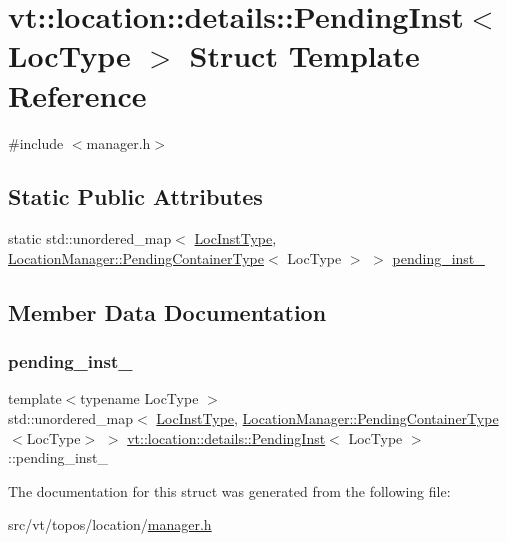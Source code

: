 \hypertarget{structvt_1_1location_1_1details_1_1_pending_inst}{}\section{vt\+:\+:location\+:\+:details\+:\+:Pending\+Inst$<$ Loc\+Type $>$ Struct Template Reference}
\label{structvt_1_1location_1_1details_1_1_pending_inst}


{\ttfamily \#include $<$manager.\+h$>$}

\subsection*{Static Public Attributes}
\begin{DoxyCompactItemize}
\item 
static std\+::unordered\+\_\+map$<$ \hyperlink{namespacevt_1_1location_a4db6456e8024af2d23fc5ae560fef866}{Loc\+Inst\+Type}, \hyperlink{structvt_1_1location_1_1_location_manager_aad005a828c535232cd6b63859b25b171}{Location\+Manager\+::\+Pending\+Container\+Type}$<$ Loc\+Type $>$ $>$ \hyperlink{structvt_1_1location_1_1details_1_1_pending_inst_ada747cad12a1705e6a7759d0e2b08476}{pending\+\_\+inst\+\_\+}
\end{DoxyCompactItemize}


\subsection{Member Data Documentation}
\mbox{\label{structvt_1_1location_1_1details_1_1_pending_inst_ada747cad12a1705e6a7759d0e2b08476}} 
\subsubsection{\texorpdfstring{pending\+\_\+inst\+\_\+}{pending\_inst\_}}
{\footnotesize\ttfamily template$<$typename Loc\+Type $>$ \\
std\+::unordered\+\_\+map$<$ \hyperlink{namespacevt_1_1location_a4db6456e8024af2d23fc5ae560fef866}{Loc\+Inst\+Type}, \hyperlink{structvt_1_1location_1_1_location_manager_aad005a828c535232cd6b63859b25b171}{Location\+Manager\+::\+Pending\+Container\+Type}$<$Loc\+Type$>$ $>$ \hyperlink{structvt_1_1location_1_1details_1_1_pending_inst}{vt\+::location\+::details\+::\+Pending\+Inst}$<$ Loc\+Type $>$\+::pending\+\_\+inst\+\_\+\hspace{0.3cm}{\ttfamily [static]}}



The documentation for this struct was generated from the following file\+:\begin{DoxyCompactItemize}
\item 
src/vt/topos/location/\hyperlink{topos_2location_2manager_8h}{manager.\+h}\end{DoxyCompactItemize}
